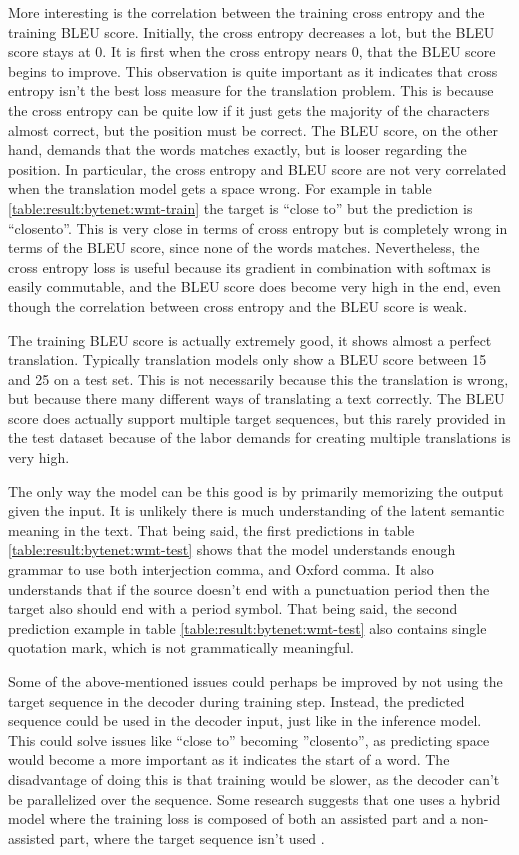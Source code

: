 More interesting is the correlation between the training cross entropy and the training BLEU score. Initially, the cross entropy decreases a lot, but the BLEU score stays at 0. It is first when the cross entropy nears 0, that the BLEU score begins to improve. This observation is quite important as it indicates that cross entropy isn't the best loss measure for the translation problem. This is because the cross entropy can be quite low if it just gets the majority of the characters almost correct, but the position must be correct. The BLEU score, on the other hand, demands that the words matches exactly, but is looser regarding the position. In particular, the cross entropy and BLEU score are not very correlated when the translation model gets a space wrong. For example in table \ref{table:result:bytenet:wmt-train} the target is ``close to'' but the prediction is ``closento''. This is very close in terms of cross entropy but is completely wrong in terms of the BLEU score, since none of the words matches. Nevertheless, the cross entropy loss is useful because its gradient in combination with softmax is easily commutable, and the BLEU score does become very high in the end, even though the correlation between cross entropy and the BLEU score is weak.

The training BLEU score is actually extremely good, it shows almost a perfect translation. Typically translation models only show a BLEU score between 15 and 25 on a test set. This is not necessarily because this the translation is wrong, but because there many different ways of translating a text correctly. The BLEU score does actually support multiple target sequences, but this rarely provided in the test dataset because of the labor demands for creating multiple translations is very high.

The only way the model can be this good is by primarily memorizing the output given the input. It is unlikely there is much understanding of the latent semantic meaning in the text. That being said, the first predictions in table \ref{table:result:bytenet:wmt-test} shows that the model understands enough grammar to use both interjection comma, and Oxford comma. It also understands that if the source doesn't end with a punctuation period then the target also should end with a period symbol. That being said, the second prediction example in table \ref{table:result:bytenet:wmt-test} also contains single quotation mark, which is not grammatically meaningful. 

Some of the above-mentioned issues could perhaps be improved by not using the target sequence in the decoder during training step. Instead, the predicted sequence could be used in the decoder input, just like in the inference model. This could solve issues like ``close to'' becoming ''closento'', as predicting space would become a more important as it indicates the start of a word. The disadvantage of doing this is that training would be slower, as the decoder can't be parallelized over the sequence. Some research suggests that one uses a hybrid model where the training loss is composed of both an assisted part and a non-assisted part, where the target sequence isn't used \cite{no-assist-train}.


